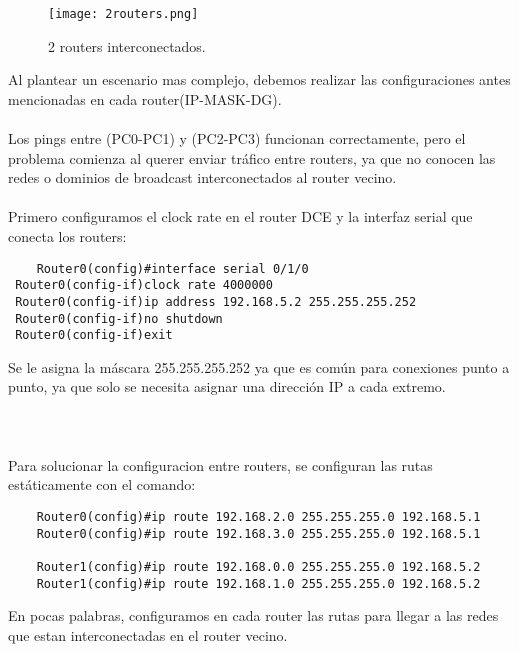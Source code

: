 \documentclass{article}
\begin{document}
\begin{figure}[H]
    \centering
    \texttt{[image: 2routers.png]}
    \caption{2 routers interconectados.}
    \label{fig:enter-label}
\end{figure}
Al plantear un escenario mas complejo, debemos realizar las configuraciones antes mencionadas en cada router(IP-MASK-DG).
\\\\
Los pings entre (PC0-PC1) y (PC2-PC3) funcionan correctamente, pero el problema comienza al querer enviar tráfico entre routers, ya que no conocen las redes o dominios de broadcast interconectados al router vecino.
\\\\
Primero configuramos el clock rate en el router DCE y la interfaz serial que conecta los routers:
\begin{lstlisting}
    Router0(config)#interface serial 0/1/0
 Router0(config-if)clock rate 4000000
 Router0(config-if)ip address 192.168.5.2 255.255.255.252
 Router0(config-if)no shutdown
 Router0(config-if)exit
\end{lstlisting}
Se le asigna la máscara 255.255.255.252 ya que es común para conexiones punto a punto, ya que solo se necesita asignar una dirección IP a cada extremo.
\\\\
\\\\
Para solucionar la configuracion entre routers, se configuran las rutas estáticamente con el comando:
\begin{lstlisting}
    Router0(config)#ip route 192.168.2.0 255.255.255.0 192.168.5.1
    Router0(config)#ip route 192.168.3.0 255.255.255.0 192.168.5.1

    Router1(config)#ip route 192.168.0.0 255.255.255.0 192.168.5.2
    Router1(config)#ip route 192.168.1.0 255.255.255.0 192.168.5.2
\end{lstlisting}
En pocas palabras, configuramos en cada router las rutas para llegar a las redes que estan interconectadas en el router vecino.
\end{document}
